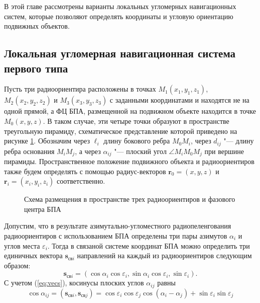 \documentclass[../main.tex]{subfiles}
\begin{document}
В этой главе рассмотрены варианты локальных угломерных навигационных систем,
которые позволяют определять координаты и угловую ориентацию подвижных
объектов.

%
% 
%
\subsection{Локальная угломерная навигационная система первого типа}
Пусть три радиоориентира расположены в точках $M_1\left(x_1, y_1, z_1\right)$, $M_2\left(x_2, y_2, z_2\right)$ и
$M_3\left(x_3, y_3, z_3\right)$ с заданными координатами и находятся не на одной прямой, а ФЦ БПА,
размещенной на подвижном объекте находится в точке $M_0\left(x, y, z\right)$. В таком случае, эти четыре точки
образуют в пространстве треугольную пирамиду, схематическое представление которой приведено на рисунке
\ref{pic:tetrahedron}. Обозначим через $\ell_i$ длину бокового ребра $M_0M_i$, через $d_{ij}$ "--- длину
ребра основания $M_iM_j$, а через $\alpha_{ij}$ "--- плоский угол $\angle M_iM_0M_j$ при вершине пирамиды.
Пространственное положение подвижного объекта и радиоориентиров также будем определять с помощью радиус-векторов
$\mathbf{r}_0 = \left(x, y, z\right)$ и $\mathbf{r}_i = \left(x_i, y_i, z_i\right)$ соответственно.

\begin{figure}[htbp]
    \begin{center}


    \caption{Схема размещения в пространстве трех радиоориентиров и фазового центра БПА}
    \label{pic:tetrahedron}
    \end{center}
\end{figure}

Допустим, что в результате азимутально-угломестного радиопеленгования радиоориентиров с использованием
БПА определены три пары азимутов $\alpha_{i}$ и углов места $\varepsilon_{i}$. Тогда в связаной системе
координат БПА можно определить три единичных вектора $\mathbf{s}_{\text{св}i}$ направлений на каждый
из радиоориентиров следующим образом:
\begin{equation}\label{eq:vecs}
    \mathbf{s}_{\text{св}i} = \left(\cos\alpha_i \cos\varepsilon_i, \sin\alpha_i\cos\varepsilon_i, \sin\varepsilon_i\right).
\end{equation}
С учетом (\ref{eq:vecs}), косинусы плоских углов $\alpha_{ij}$ равны
\begin{equation}
    \cos\alpha_{ij} = \left(\mathbf{s}_{\text{св}i}, \mathbf{s}_{\text{св}j}\right) =
    \cos\varepsilon_i \cos\varepsilon_j \cos\left(\alpha_i - \alpha_j\right) + \sin\varepsilon_i \sin\varepsilon_j
\end{equation}
\end{document}
